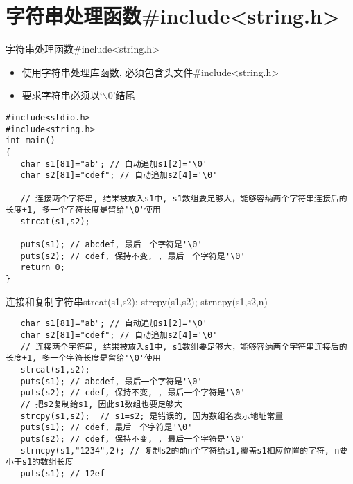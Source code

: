 
\section{字符串处理函数\#include<string.h>}

\begin{frame}{字符串处理函数\#include<string.h>}
\vspace{-0.2cm}
\begin{itemize}
	\item 使用字符串处理库函数, 必须包含头文件\#include<string.h>
	\item 要求字符串必须以`$\backslash$0'结尾
\end{itemize}
\vspace{-0.2cm}
\begin{lstlisting}
#include<stdio.h>
#include<string.h>
int main()
{
   char s1[81]="ab"; // 自动追加s1[2]='\0'
   char s2[81]="cdef"; // 自动追加s2[4]='\0'
   
   // 连接两个字符串, 结果被放入s1中, s1数组要足够大，能够容纳两个字符串连接后的长度+1, 多一个字符长度是留给'\0'使用
   strcat(s1,s2); 
   
   puts(s1); // abcdef, 最后一个字符是'\0'
   puts(s2); // cdef, 保持不变, , 最后一个字符是'\0'
   return 0;
}
\end{lstlisting}
\end{frame}


\begin{frame}{\small{连接和复制字符串strcat(s1,s2); strcpy(s1,s2); strncpy(s1,s2,n)}}
\vspace{-0.3cm}
\begin{lstlisting}
   char s1[81]="ab"; // 自动追加s1[2]='\0'
   char s2[81]="cdef"; // 自动追加s2[4]='\0'
   // 连接两个字符串, 结果被放入s1中, s1数组要足够大，能够容纳两个字符串连接后的长度+1, 多一个字符长度是留给'\0'使用
   strcat(s1,s2); 
   puts(s1); // abcdef, 最后一个字符是'\0'
   puts(s2); // cdef, 保持不变, , 最后一个字符是'\0'
   // 把s2复制给s1, 因此s1数组也要足够大
   strcpy(s1,s2);  // s1=s2; 是错误的, 因为数组名表示地址常量
   puts(s1); // cdef, 最后一个字符是'\0'
   puts(s2); // cdef, 保持不变, , 最后一个字符是'\0'
   strncpy(s1,"1234",2); // 复制s2的前n个字符给s1,覆盖s1相应位置的字符, n要小于s1的数组长度
   puts(s1); // 12ef
\end{lstlisting}
\end{frame}

